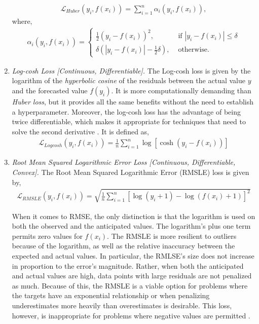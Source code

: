 \documentclass{article}
\begin{document}
\begin{enumerate}
\begin{equation}
      \begin{split}
        \mathcal{L}_{Huber}(y_i, f(x_i)) = \sum^{n}_{i=1} \alpha_i(y_i, f(x_i)),
      \end{split}
    \end{equation}
    where, 
    \begin{equation*}
      \begin{split}
        \alpha_i(y_i, f(x_i)) =\begin{cases}
          \frac{1}{2} (y_i-f(x_i))^2, &\text{ if } |y_i -f(x_i) | \leq \delta \\  
          \delta\left( |y_i -f(x_i)| -\frac{1}{2}\delta \right), &\text{ otherwise.} 
        \end{cases}
      \end{split}
    \end{equation*}
    \item \textit{Log-cosh Loss [Continuous, Differentiable].} The Log-cosh loss is given by the logarithm of the \textit{hyperbolic cosine} of the residuals between the actual value $y$ and the forecasted value $f(y_i)$. It is more computationally demanding than \textit{Huber loss}, but it provides all the same benefits without the need to establish a hyperparameter. Moreover, the log-cosh loss has the advantage of being twice differentiable, which makes it appropriate for techniques that need to solve the second derivative \citep{ciampiconi2023survey}. It is defined as, 
  \begin{equation}
      \begin{split}
        \mathcal{L}_{Logcosh}(y_i, f(x_i)) = \frac{1}{n} \sum^{n}_{i=1} \log[\cosh(y_i-f(x_i))]
      \end{split}
    \end{equation}
    \item \textit{Root Mean Squared Logarithmic Error Loss [Continuous, Differentiable, Convex].} The Root Mean Squared Logarithmic Error (RMSLE) loss is given by,
\begin{equation}
      \begin{split}
        \mathcal{L}_{RMSLE}(y_i, f(x_i)) = \sqrt{\frac{1}{n} \sum^{n}_{i=1} [\log (y_i + 1) - \log(f(x_i)+1)]^2 }
      \end{split}
    \end{equation}

     When it comes to RMSE, the only distinction is that the logarithm is used on both the observed and the anticipated values. The logarithm's plus one term permits zero values for $f(x_i)$. The RMSLE is more resilient to outliers because of the logarithm, as well as the relative inaccuracy between the expected and actual values. In particular, the RMLSE's size does not increase in proportion to the error's magnitude. Rather, when both the anticipated and actual values are high, data points with large residuals are not penalized as much. Because of this, the RMSLE is a viable option for problems where the targets have an exponential relationship or when penalizing underestimates more heavily than overestimates is desirable. This loss, however, is inappropriate for problems where negative values are permitted \citep{ciampiconi2023survey}.
  \end{enumerate}
\end{document}
